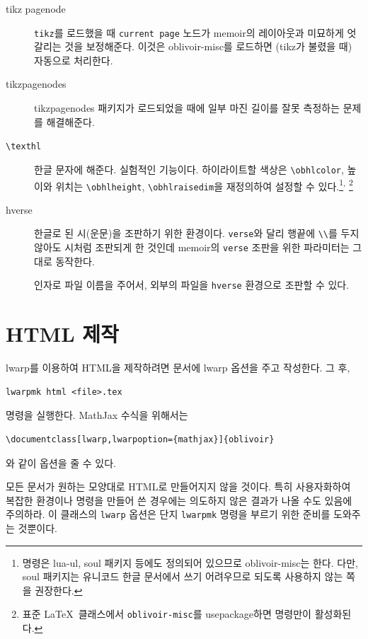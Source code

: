 \documentclass[
	12pt,
	a4paper,
	kosection,
	footnote,
	microtype,
	figtabcapt,
]{oblivoir}
\def\cs#1{\texttt{\textbackslash #1}}
\def\pkg#1{\textsf{#1}}
\def\env#1{\texttt{#1}}
\begin{document}
\begin{description}
\item[tikz pagenode] \texttt{tikz}를 로드했을 때 \texttt{current page}
노드가 memoir의 레이아웃과 미묘하게 엇갈리는 것을 보정해준다. 이것은 oblivoir-misc를 로드하면 (tikz가 불렸을 때) 자동으로 처리한다.
\item[tikzpagenodes] tikzpagenodes 패키지가 로드되었을 때에 일부 마진 길이를
잘못 측정하는 문제를 해결해준다.
\item[\cs{texthl}] 한글 문자에 해준다. 실험적인 기능이다.
하이라이트할 색상은 \cs{obhlcolor}, 높이와
위치는 \cs{obhlheight}, \cs{obhlraisedim}을 재정의하여 설정할 수 있다.\footnote{%
	\cmd{\texthl} 명령은 \pkg{lua-ul}, \pkg{soul} 패키지 등에도 정의되어 있으므로
	\pkg{oblivoir-misc}는 \cmd{\providecommand}한다. 다만, \pkg{soul} 패키지는 유니코드 한글
	문서에서 쓰기 어려우므로 되도록 사용하지 않는 쪽을 권장한다.}\textsuperscript{, }%
	\footnote{표준 \LaTeX\ 클래스에서 \texttt{oblivoir-misc}를 usepackage하면
	 명령만이 활성화된다.}
\item[hverse] 한글로 된 시(운문)을 조판하기 위한 환경이다. \texttt{verse}와 달리 행끝에 \verb|\\|를 두지 않아도 시처럼 조판되게 한 것인데 \pkg{memoir}의 \texttt{verse} 조판을 위한 파라미터는 그대로 동작한다.
\item[\cmdprint{\hverseinput}] 인자로 파일 이름을 주어서, 외부의 파일을 \env{hverse} 환경으로 조판할 수 있다.
\end{description}


\section{HTML 제작}

\textsf{lwarp}를 이용하여 HTML을 제작하려면 문서에 \textsf{lwarp} 
옵션을 주고 작성한다. 그 후,
\begin{verbatim}
lwarpmk html <file>.tex
\end{verbatim}
명령을 실행한다. MathJax 수식을 위해서는 
\begin{verbatim}
\documentclass[lwarp,lwarpoption={mathjax}]{oblivoir}
\end{verbatim}
와 같이 옵션을 줄 수 있다.

모든 문서가 원하는 모양대로 HTML로 만들어지지 않을 것이다. 특히
사용자화하여 복잡한 환경이나 명령을 만들어 쓴 경우에는 의도하지 않은
결과가 나올 수도 있음에 주의하라. 이 클래스의 \verb|lwarp| 옵션은
단지 \verb|lwarpmk| 명령을 부르기 위한 준비를 도와주는 것뿐이다.
\end{document}
